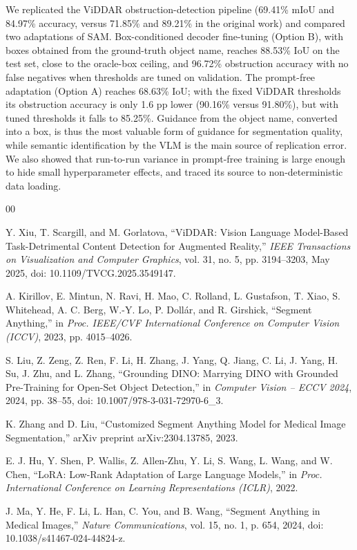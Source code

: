 \documentclass[conference]{IEEEtran}
\begin{document}
We replicated the ViDDAR obstruction-detection pipeline (69.41\% mIoU and 84.97\% accuracy, versus 71.85\% and 89.21\% in the original work) and compared two adaptations of SAM. Box-conditioned decoder fine-tuning (Option B), with boxes obtained from the ground-truth object name, reaches 88.53\% IoU on the test set, close to the oracle-box ceiling, and 96.72\% obstruction accuracy with no false negatives when thresholds are tuned on validation. The prompt-free adaptation (Option A) reaches 68.63\% IoU; with the fixed ViDDAR thresholds its obstruction accuracy is only 1.6 pp lower (90.16\% versus 91.80\%), but with tuned thresholds it falls to 85.25\%. Guidance from the object name, converted into a box, is thus the most valuable form of guidance for segmentation quality, while semantic identification by the VLM is the main source of replication error. We also showed that run-to-run variance in prompt-free training is large enough to hide small hyperparameter effects, and traced its source to non-deterministic data loading.



\begin{thebibliography}{00}

Y. Xiu, T. Scargill, and M. Gorlatova,
``ViDDAR: Vision Language Model-Based Task-Detrimental Content Detection for Augmented Reality,''
\emph{IEEE Transactions on Visualization and Computer Graphics},
vol. 31, no. 5, pp. 3194--3203, May 2025,
doi: 10.1109/TVCG.2025.3549147.

A. Kirillov, E. Mintun, N. Ravi, H. Mao, C. Rolland,
L. Gustafson, T. Xiao, S. Whitehead, A. C. Berg,
W.-Y. Lo, P. Dollár, and R. Girshick,
``Segment Anything,''
in \emph{Proc. IEEE/CVF International Conference on Computer Vision (ICCV)},
2023, pp. 4015--4026.

S. Liu, Z. Zeng, Z. Ren, F. Li, H. Zhang, J. Yang,
Q. Jiang, C. Li, J. Yang, H. Su, J. Zhu, and L. Zhang,
``Grounding DINO: Marrying DINO with Grounded Pre-Training for
Open-Set Object Detection,''
in \emph{Computer Vision -- ECCV 2024},
2024, pp. 38--55,
doi: 10.1007/978-3-031-72970-6\_3.

K. Zhang and D. Liu,
``Customized Segment Anything Model for Medical Image Segmentation,''
arXiv preprint arXiv:2304.13785, 2023.

E. J. Hu, Y. Shen, P. Wallis, Z. Allen-Zhu, Y. Li,
S. Wang, L. Wang, and W. Chen,
``LoRA: Low-Rank Adaptation of Large Language Models,''
in \emph{Proc. International Conference on Learning Representations (ICLR)},
2022.

J. Ma, Y. He, F. Li, L. Han, C. You, and B. Wang,
``Segment Anything in Medical Images,''
\emph{Nature Communications}, vol. 15, no. 1, p. 654, 2024,
doi: 10.1038/s41467-024-44824-z.

\end{thebibliography}
\end{document}
